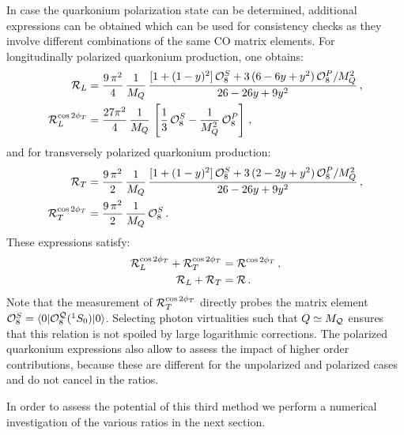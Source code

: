 \documentclass[prd,aps,preprintnumbers,nofootinbib,superscriptaddress]{revtex4}
\newcommand{\sT}{{\scriptscriptstyle T}}
\begin{document}
In case the quarkonium polarization state can be determined, additional expressions can be obtained which can be used for consistency checks as they involve different combinations of the same CO matrix elements. For longitudinally polarized quarkonium production, one obtains: 
\begin{align}
{\cal R}_L & = \frac{9\, \pi^2}{4}\,\frac{1}{M_Q} \, \frac{ [ 1+(1-y)^2 ] \, {\cal O}_{8}^S + 3\, ( 6-6y+y^2  )\, {\cal O}_{8}^P /M_{Q}^{2}}{26 -26 y +9 y^2}  \,,\\
{\cal R}_L^{\cos2\phi_\sT} & =  \frac{27 \pi^2}{4}\, \frac{1}{M_Q} \,  \left [\frac{1}{3}\,{\cal O}_8^S - \frac{1}{M_Q^2} \, {\cal O}_8^P \right ] 
\,,
\end{align}
and for transversely polarized quarkonium production:
\begin{align}
{\cal R}_T & = \frac{9\, \pi^2}{2}\,\frac{1}{M_Q} \, \frac{ [ 1+(1-y)^2 ] \, {\cal O}_{8}^S + 3\, ( 2-2y+y^2  )\, {\cal O}_{8}^P /M_{Q}^{2}}{26 -26 y +9 y^2}  \,,\\
{\cal R}_T^{\cos2\phi_\sT}  & =   \frac{9\, \pi^2}{2}\, \frac{1}{M_Q} \,{\cal O}_8^S   \,.
\end{align}
These expressions satisfy:
\begin{align}
{\cal R}_L^{\cos2\phi_\sT} + {\cal R}_T^{\cos2\phi_\sT} &  = {\cal R}^{\cos2\phi_\sT} \,,\\
{\cal R}_L + {\cal R}_T &  = {\cal R} \,.
\end{align}
Note that the measurement of ${\cal R}_T^{\cos 2\phi_\sT}$  directly probes the matrix element ${\cal O}_{8}^S=  \langle0\vert{\cal O}_{8}^{{\cal Q}}(^{1}S_{0})\vert0\rangle $. Selecting photon virtualities such that $Q\simeq M_{\cal Q}$ ensures that this relation is not spoiled by large logarithmic corrections. The polarized quarkonium expressions also allow to assess the impact of higher order contributions, because these are different for the unpolarized and polarized cases and do not cancel in the ratios.  

In order to assess the potential of this third method we perform a numerical investigation of the various ratios in the next section.
\end{document}
